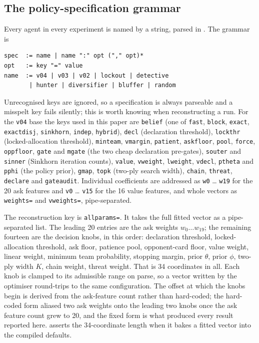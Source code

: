 \documentclass[11pt]{article}
\theoremstyle{definition}
\newcommand{\numParams}{34}
\newcommand{\numAskFeats}{20}
\newcommand{\numValueFeats}{16}
\begin{document}
\subsection{The policy-specification grammar}
\label{app:repro-spec}

Every agent in every experiment is named by a string, parsed in
. The grammar is

\begin{verbatim}
spec  := name | name ":" opt ("," opt)*
opt   := key "=" value
name  := v04 | v03 | v02 | lockout | detective
       | hunter | diversifier | bluffer | random
\end{verbatim}

Unrecognised keys are ignored, so a specification is always parseable and a
misspelt key fails silently; this is worth knowing when reconstructing a run.
For the \texttt{v04} base the keys used in this paper are
\texttt{belief} (one of \texttt{fast}, \texttt{block}, \texttt{exact},
\texttt{exactdisj}, \texttt{sinkhorn}, \texttt{indep}, \texttt{hybrid}),
\texttt{decl} (declaration threshold), \texttt{lockthr} (locked-allocation
threshold), \texttt{minteam}, \texttt{vmargin}, \texttt{patient},
\texttt{askfloor}, \texttt{pool}, \texttt{force}, \texttt{oppfloor},
\texttt{gate} and \texttt{mgate} (the two cheap declaration pre-gates),
\texttt{souter} and \texttt{sinner} (Sinkhorn iteration counts), \texttt{value},
\texttt{vweight}, \texttt{lweight}, \texttt{vdecl}, \texttt{ptheta} and
\texttt{pphi} (the policy prior), \texttt{gmap}, \texttt{topk} (two-ply search
width), \texttt{chain}, \texttt{threat}, \texttt{declare} and
\texttt{gateaudit}. Individual coefficients are addressed as \texttt{w0}
\ldots{} \texttt{w19} for the \numAskFeats{} ask features and \texttt{v0}
\ldots{} \texttt{v15} for the \numValueFeats{} value features, and whole vectors
as \texttt{weights=} and \texttt{vweights=}, pipe-separated.

The reconstruction key is \texttt{allparams=}. It takes the full fitted vector
as a pipe-separated list. The leading \numAskFeats{} entries are the ask weights
$w_0 \ldots w_{19}$; the remaining fourteen are the decision knobs, in this
order: declaration threshold, locked-allocation threshold, ask floor, patience
pool, opponent-card floor, value weight, linear weight, minimum team
probability, stopping margin, prior $\theta$, prior $\phi$, two-ply width $K$,
chain weight, threat weight. That is \numParams{} coordinates in all. Each knob
is clamped to its admissible range on parse, so a vector written by the
optimiser round-trips to the same configuration. The offset at which the knobs
begin is derived from the ask-feature count rather than hard-coded; the
hard-coded form aliased two ask weights onto the leading two knobs once the ask
feature count grew to \numAskFeats{}, and the fixed form is what produced every
result reported here.  asserts the
\numParams{}-coordinate length when it bakes a fitted vector into the compiled
defaults.
\end{document}
